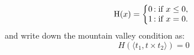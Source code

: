 \begin{equation} \label{eq:heaviside}
\text{H}(x) = \left\{
     \begin{array}{@{}l@{\thinspace}l}
       0  &: \text{if } x \leq 0, \\
       1 &: \text{if } x = 0. \\
     \end{array}
   \right.
\end{equation}
and write down the mountain valley condition as:
\begin{equation} \label{eq:mountain_valley}
H(\langle t_1, t \times t_2 \rangle) = 0
\end{equation}
